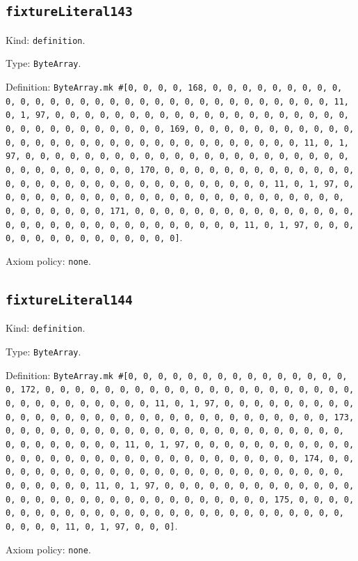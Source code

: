 \documentclass[11pt]{article}
\begin{document}
\subsection*{\texttt{fixtureLiteral143}}
\noindent Kind: \texttt{definition}.\par
\noindent Type: \texttt{ByteArray}.\par
\noindent Definition: \texttt{ByteArray.mk \#[0, 0, 0, 0, 168, 0, 0, 0, 0, 0, 0, 0, 0, 0, 0, 0, 0, 0, 0, 0, 0, 0, 0, 0, 0, 0, 0, 0, 0, 0, 0, 0, 0, 0, 0, 0, 11, 0, 1, 97, 0, 0, 0, 0, 0, 0, 0, 0, 0, 0, 0, 0, 0, 0, 0, 0, 0, 0, 0, 0, 0, 0, 0, 0, 0, 0, 0, 0, 0, 0, 0, 169, 0, 0, 0, 0, 0, 0, 0, 0, 0, 0, 0, 0, 0, 0, 0, 0, 0, 0, 0, 0, 0, 0, 0, 0, 0, 0, 0, 0, 0, 0, 0, 11, 0, 1, 97, 0, 0, 0, 0, 0, 0, 0, 0, 0, 0, 0, 0, 0, 0, 0, 0, 0, 0, 0, 0, 0, 0, 0, 0, 0, 0, 0, 0, 0, 0, 0, 170, 0, 0, 0, 0, 0, 0, 0, 0, 0, 0, 0, 0, 0, 0, 0, 0, 0, 0, 0, 0, 0, 0, 0, 0, 0, 0, 0, 0, 0, 0, 0, 11, 0, 1, 97, 0, 0, 0, 0, 0, 0, 0, 0, 0, 0, 0, 0, 0, 0, 0, 0, 0, 0, 0, 0, 0, 0, 0, 0, 0, 0, 0, 0, 0, 0, 0, 171, 0, 0, 0, 0, 0, 0, 0, 0, 0, 0, 0, 0, 0, 0, 0, 0, 0, 0, 0, 0, 0, 0, 0, 0, 0, 0, 0, 0, 0, 0, 0, 11, 0, 1, 97, 0, 0, 0, 0, 0, 0, 0, 0, 0, 0, 0, 0, 0, 0, 0]}.\par
\noindent Axiom policy: \texttt{none}.\par
\subsection*{\texttt{fixtureLiteral144}}
\noindent Kind: \texttt{definition}.\par
\noindent Type: \texttt{ByteArray}.\par
\noindent Definition: \texttt{ByteArray.mk \#[0, 0, 0, 0, 0, 0, 0, 0, 0, 0, 0, 0, 0, 0, 0, 0, 172, 0, 0, 0, 0, 0, 0, 0, 0, 0, 0, 0, 0, 0, 0, 0, 0, 0, 0, 0, 0, 0, 0, 0, 0, 0, 0, 0, 0, 0, 0, 0, 11, 0, 1, 97, 0, 0, 0, 0, 0, 0, 0, 0, 0, 0, 0, 0, 0, 0, 0, 0, 0, 0, 0, 0, 0, 0, 0, 0, 0, 0, 0, 0, 0, 0, 0, 173, 0, 0, 0, 0, 0, 0, 0, 0, 0, 0, 0, 0, 0, 0, 0, 0, 0, 0, 0, 0, 0, 0, 0, 0, 0, 0, 0, 0, 0, 0, 0, 11, 0, 1, 97, 0, 0, 0, 0, 0, 0, 0, 0, 0, 0, 0, 0, 0, 0, 0, 0, 0, 0, 0, 0, 0, 0, 0, 0, 0, 0, 0, 0, 0, 0, 0, 174, 0, 0, 0, 0, 0, 0, 0, 0, 0, 0, 0, 0, 0, 0, 0, 0, 0, 0, 0, 0, 0, 0, 0, 0, 0, 0, 0, 0, 0, 0, 0, 11, 0, 1, 97, 0, 0, 0, 0, 0, 0, 0, 0, 0, 0, 0, 0, 0, 0, 0, 0, 0, 0, 0, 0, 0, 0, 0, 0, 0, 0, 0, 0, 0, 0, 0, 175, 0, 0, 0, 0, 0, 0, 0, 0, 0, 0, 0, 0, 0, 0, 0, 0, 0, 0, 0, 0, 0, 0, 0, 0, 0, 0, 0, 0, 0, 0, 0, 11, 0, 1, 97, 0, 0, 0]}.\par
\noindent Axiom policy: \texttt{none}.\par
\end{document}
